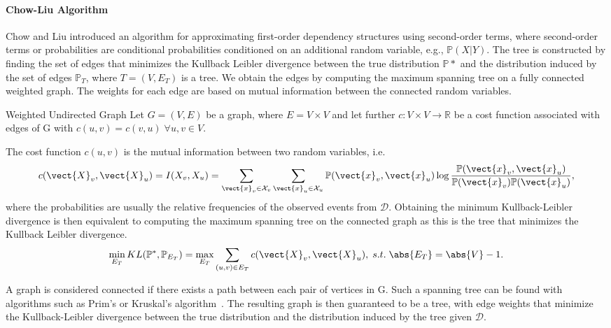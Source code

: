 \paragraph*{Chow-Liu Algorithm}
Chow and Liu introduced an algorithm\cite{chow1968approximating} for approximating first-order dependency structures using second-order terms, where second-order terms or probabilities are conditional probabilities conditioned on an additional random variable, e.g., $\mathbb{P}(X \lvert Y)$.
The tree is constructed by finding the set of edges that minimizes the Kullback Leibler divergence between the true distribution $\mathbb{P}*$ and the distribution induced by the set of edges $\mathbb{P}_T$, where $T=(V, E_T)$ is a tree.
We obtain the edges by computing the maximum spanning tree on a fully connected weighted graph.
The weights for each edge are based on mutual information between the connected random variables.

\begin{definition}{Weighted Undirected Graph}
    Let $G=(V,E)$ be a graph, where $E = V \times V$ and let further $c: V \times V \rightarrow \mathbb{R}$ be a cost function associated with edges of G with $c(u,v) = c(v,u) \; \forall u,v \in V$.
\end{definition}

The cost function $c(u,v)$ is the mutual information between two random variables, i.e. 
\begin{equation}
    c(\vect{X}_v, \vect{X}_u) = I(X_v, X_u) = \sum_{\vect{x}_v \in \mathcal{X}_v} \sum_{\vect{x}_u \in \mathcal{X}_u} \mathbb{P}(\vect{x}_v,\vect{x}_u) \log \frac{\mathbb{P}(\vect{x}_v,\vect{x}_u) }{\mathbb{P}(\vect{x}_v)  \mathbb{P}(\vect{x}_u)},
\end{equation}
where the probabilities are usually the relative frequencies of the observed events from $\mathcal{D}$.
Obtaining the minimum Kullback-Leibler divergence is then equivalent to computing the maximum spanning tree on the connected graph as this is the tree that minimizes the Kullback Leibler divergence.~\cite{kirshner2012conditional}
\begin{equation}
    \min_{E_T} KL(\mathbb{P}^*, \mathbb{P}_{E_T}) = \max_{E_T} \sum_{(u,v) \in E_T} c(\vect{X}_v, \vect{X}_u), \; s.t. \; \abs{E_T} = \abs{V}-1 .
\end{equation}



A graph is considered connected if there exists a path between each pair of vertices in G. 
Such a spanning tree can be found with algorithms such as Prim's or Kruskal's algorithm~\cite{graham1985history}.
The resulting graph is then guaranteed to be a tree, with edge weights that minimize the Kullback-Leibler divergence between the true distribution and the distribution induced by the tree given $\mathcal{D}$.

